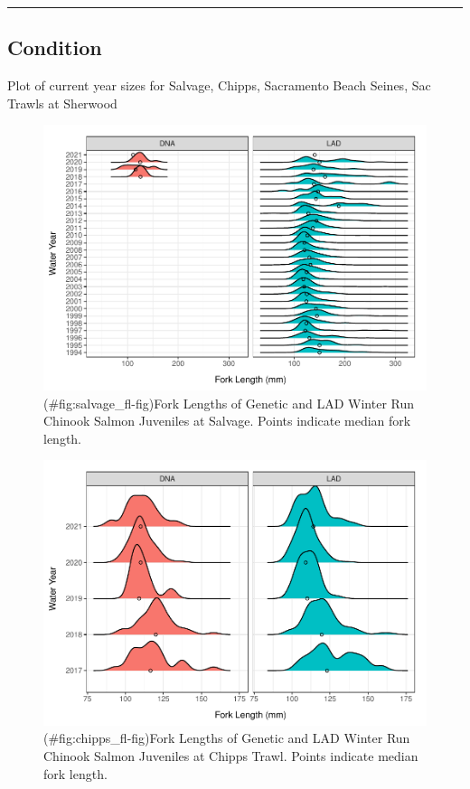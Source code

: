 \documentclass[
]{book}
\theoremstyle{definition}
\theoremstyle{definition}
\theoremstyle{definition}
\theoremstyle{definition}
\theoremstyle{remark}
\begin{document}
\begin{center}\rule{0.5\linewidth}{0.5pt}\end{center}

\hypertarget{condition-2}{%
\subsection{Condition}\label{condition-2}}

Plot of current year sizes for Salvage, Chipps, Sacramento Beach Seines, Sac Trawls at Sherwood

\begin{figure}
\centering
\includegraphics{_main_files/figure-latex/salvage_fl-fig-1.pdf}
\caption{(\#fig:salvage\_fl-fig)Fork Lengths of Genetic and LAD Winter Run Chinook Salmon Juveniles at Salvage. Points indicate median fork length.}
\end{figure}

\begin{figure}
\centering
\includegraphics{_main_files/figure-latex/chipps_fl-fig-1.pdf}
\caption{(\#fig:chipps\_fl-fig)Fork Lengths of Genetic and LAD Winter Run Chinook Salmon Juveniles at Chipps Trawl. Points indicate median fork length.}
\end{figure}
\end{document}
